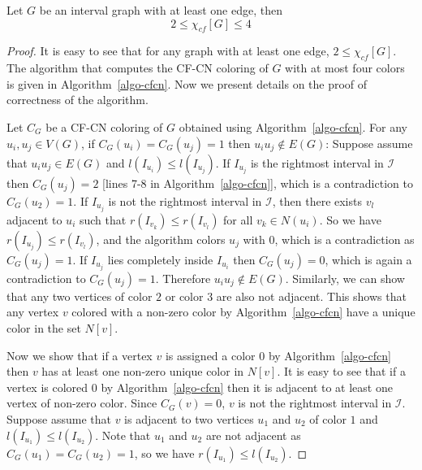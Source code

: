 \documentclass[svgnames]{llncs}
\newcommand{\cfcn}{\textsc {CF-CN}}
\begin{document}
\setcounter{theorem}{4}

\begin{theorem}\label{th-cfcn-interval}
Let $G$ be an interval graph with at least one edge, then $$2 \leq \chi_{cf}[G] \leq 4$$
\end{theorem}
\begin{proof}
It is easy to see that for any graph with at least one edge, $2 \leq \chi_{cf}[G]$.
The algorithm that computes the \cfcn{} coloring of $G$ with at most four colors is given in Algorithm~\ref{algo-cfcn}.
Now we present details on the
proof of correctness of the algorithm.

Let $C_G$ be a \cfcn{} coloring of $G$  obtained using Algorithm~\ref{algo-cfcn}. 
For any $u_i, u_j \in V(G)$, if $C_G(u_i)=C_G(u_j)=1$ then $u_iu_j \notin E(G)$:
Suppose assume that $u_iu_j \in E(G)$ and $l(I_{u_i}) \leq l(I_{u_j})$. 
If $I_{u_j}$ is the rightmost interval in $\mathcal{I}$ then $C_G(u_j)=2$ [lines 7-8 in Algorithm~\ref{algo-cfcn}],
which is a contradiction to $C_G(u_2)=1$.
If $I_{u_j}$ is not the rightmost interval in $\mathcal{I}$,  
then there exists $v_l$ adjacent to $u_i$ such that 
$r(I_{v_k}) \leq r(I_{v_l})$ for all $v_k \in N(u_i)$. So we have $r(I_{u_j}) \leq r(I_{v_l})$, and the algorithm colors $u_j$ with $0$, which is a contradiction as $C_G(u_j)=1$. 
If $I_{u_j}$ lies completely inside $I_{u_i}$ then $C_G(u_j)=0$, which is again a contradiction to $C_G(u_j)=1$.
Therefore $u_iu_j \notin E(G)$.
Similarly, we can show that any two vertices of color $2$ or color $3$ are also not adjacent. This shows that any vertex $v$ colored with a non-zero color by Algorithm~\ref{algo-cfcn} have a unique color in the set $N[v]$.

Now we show that if a vertex $v$ is assigned a color $0$ by Algorithm~\ref{algo-cfcn} then $v$ has at least one 
non-zero unique color in $N[v]$. It is easy to see that if a vertex is colored $0$ by Algorithm~\ref{algo-cfcn} then it is adjacent to at least one vertex of non-zero color. 
Since $C_G(v)=0$, $v$ is not the rightmost interval in $\mathcal{I}$. 
Suppose assume that $v$ is adjacent to two vertices $u_1$ and $u_2$ of color $1$ and $l(I_{u_1}) \leq l(I_{u_2})$. 
Note that $u_1$ and $u_2$ are not adjacent as $C_G(u_1)=C_G(u_2)= 1$, so we have  $r(I_{u_1}) \leq l(I_{u_2})$.


\end{proof}
\end{document}
